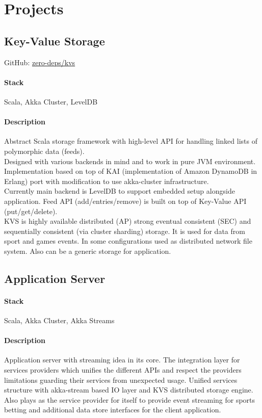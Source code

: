 \section{Projects}
\subsection{Key-Value Storage}
GitHub: \href{https://github.com/zero-deps/kvs}{zero-deps/kvs}
\paragraph{Stack} Scala, Akka Cluster, LevelDB
\paragraph{Description}
Abstract Scala storage framework with high-level API for handling linked lists of polymorphic data (feeds).\\
Designed with various backends in mind and to work in pure JVM environment. Implementation based on top of KAI (implementation of Amazon DynamoDB in Erlang) port with modification to use akka-cluster infrastructure.\\
Currently main backend is LevelDB to support embedded setup alongside application. Feed API (add/entries/remove) is built on top of Key-Value API (put/get/delete).\\
KVS is highly available distributed (AP) strong eventual consistent (SEC) and sequentially consistent (via cluster sharding) storage. It is used for data from sport and games events. In some configurations used as distributed network file system. Also can be a generic storage for application.

\subsection{Application Server}
\paragraph{Stack} Scala, Akka Cluster, Akka Streams
\paragraph{Description}
Application server with streaming idea in its core. The integration layer for services providers which unifies the different APIs and respect the providers limitations guarding their services from unexpected usage. Unified services structure with akka-stream based IO layer and KVS distributed storage engine. Also plays as the service provider for itself to provide event streaming for sports betting and additional data store interfaces for the client application.

